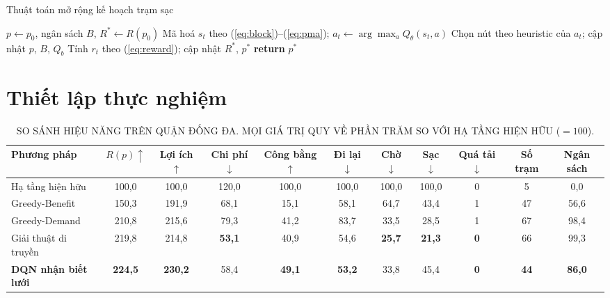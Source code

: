 \documentclass[10pt, conference, a4paper, compsocconf]{IEEEtran}
\begin{document}
\begin{algorithm}
\caption{Thuật toán mở rộng kế hoạch trạm sạc}
\label{alg:rollout}
\begin{algorithmic}[1]
\STATE $p \leftarrow p_0$, ngân sách $B$, $R^{*} \leftarrow R(p_0)$
  \STATE Mã hoá $s_t$ theo (\ref{eq:block})--(\ref{eq:pma});
  \STATE $a_t \leftarrow \arg\max_a Q_\theta(s_t,a)$
  \STATE Chọn nút theo heuristic của $a_t$; cập nhật $p$, $B$, $Q_b$
  \STATE Tính $r_t$ theo (\ref{eq:reward}); cập nhật $R^{*}$, $p^{*}$
\ENDWHILE
\STATE \textbf{return} $p^{*}$
\end{algorithmic}
\end{algorithm}

\section{Thiết lập thực nghiệm}
\label{sec:setup}

\begin{table}[!t]
\renewcommand{\arraystretch}{1.15}
\setlength{\tabcolsep}{5pt}
\caption{SO SÁNH HIỆU NĂNG TRÊN QUẬN ĐỐNG ĐA. MỌI GIÁ TRỊ QUY VỀ PHẦN TRĂM SO VỚI HẠ TẦNG HIỆN HỮU ($=100$).}
\label{tab:results}
\centering
\footnotesize
\begin{tabular}{lcccccccccc}
\toprule
Phương pháp & $R(p)\uparrow$ & Lợi ích $\uparrow$ & Chi phí $\downarrow$ & Công bằng $\uparrow$ & Đi lại $\downarrow$ & Chờ $\downarrow$ & Sạc $\downarrow$ & Quá tải $\downarrow$ & Số trạm & Ngân sách \\
\midrule
Hạ tầng hiện hữu            & 100,0 & 100,0 & 120,0 & 100,0 & 100,0 & 100,0 & 100,0 & 0 & 5 & 0,0 \\
Greedy-Benefit              & 150,3 & 191,9 & 68,1 & 15,1 & 58,1 & 64,7 & 43,4 & 1 & 47 & 56,6 \\
Greedy-Demand               & 210,8 & 215,6 & 79,3 & 41,2 & 83,7 & 33,5 & 28,5 & 1 & 67 & 98,4 \\
Giải thuật di truyền        & 219,8 & 214,8 & \textbf{53,1} & 40,9 & 54,6 & \textbf{25,7} & \textbf{21,3} & \textbf{0} & 66 & 99,3 \\
\textbf{DQN nhận biết lưới} & \textbf{224,5} & \textbf{230,2} & 58,4 & \textbf{49,1} & \textbf{53,2} & 33,8 & 45,4 & \textbf{0} & \textbf{44} & \textbf{86,0} \\
\bottomrule
\end{tabular}
\end{table}
\end{document}
